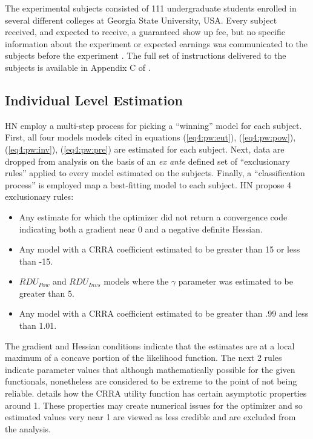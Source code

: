 \documentclass[../main.tex]{subfiles}
\begin{document}
The experimental subjects consisted of 111 undergraduate students enrolled in several different colleges at Georgia State University, USA.
Every subject received, and expected to receive, a guaranteed  show up fee, but no specific information about the experiment or expected earnings was communicated to the subjects before the experiment \parencite[98]{Harrison2016}.
The full set of instructions delivered to the subjects is available in Appendix C of \textcite{Harrison2016}.

\subsection{Individual Level Estimation}
\label{sec4:ILE}

HN employ a multi-step process for picking a \enquote{winning} model for each subject.
First, all four models models cited in equations (\ref{eq4:pw:eut}), (\ref{eq4:pw:pow}), (\ref{eq4:pw:inv}), (\ref{eq4:pw:pre}) are estimated for each subject.
Next, data are dropped from analysis on the basis of an \textit{ex ante} defined set of \enquote{exclusionary rules} applied to every model estimated on the subjects.
Finally, a \enquote{classification process} is employed map a best-fitting model to each subject.
HN propose 4 exclusionary rules:
\begin{itemize}
	\item Any estimate for which the optimizer did not return a convergence code indicating both a gradient near 0 and a negative definite Hessian.
	\item Any model with a CRRA coefficient estimated to be greater than 15 or less than -15.
	\item $\mathit{RDU_{Pow}}$ and $\mathit{RDU_{Invs}}$ models where the $\gamma$ parameter was estimated to be greater than 5.
	\item Any model with a CRRA coefficient estimated to be greater than .99 and less than 1.01.
\end{itemize}

\noindent The gradient and Hessian conditions indicate that the estimates are at a local maximum of a concave portion of the likelihood function.
The next 2 rules indicate parameter values that although mathematically possible for the given functionals, nonetheless are considered to be extreme to the point of not being reliable.
\textcite{Wakker2008} details how the CRRA utility function has certain asymptotic properties around 1.
These properties may create numerical issues for the optimizer and so estimated values very near 1 are viewed as less credible and are excluded from the analysis.
\end{document}
